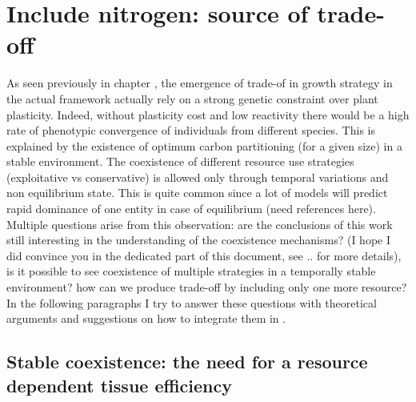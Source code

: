 

\chapter{Include nitrogen: source of trade-off}

As seen previously in chapter %
, the emergence of trade-of in growth strategy in the actual framework actually rely on a strong genetic constraint over plant plasticity. Indeed, without plasticity cost and low reactivity there would be a high rate of phenotypic convergence of individuals from different species. This is explained by the existence of optimum carbon partitioning (for a given size) in a stable environment. The coexistence of different resource use strategies (exploitative vs conservative) is allowed only through temporal variations and non equilibrium state. This is quite common since a lot of models will predict rapid dominance of one entity in case of equilibrium (need references here).\\
Multiple questions arise from this observation: are the conclusions of this work still interesting in the understanding of the coexistence mechanisms? (I hope I did convince you in the dedicated part of this document, see .. for more details), is it possible to see coexistence of multiple strategies in a temporally stable environment? how can we produce trade-off by including only one more resource?\\

In the following paragraphs I try to answer these questions with theoretical arguments and suggestions on how to integrate them in \model.

\section{Stable coexistence: the need for a resource dependent tissue efficiency}

